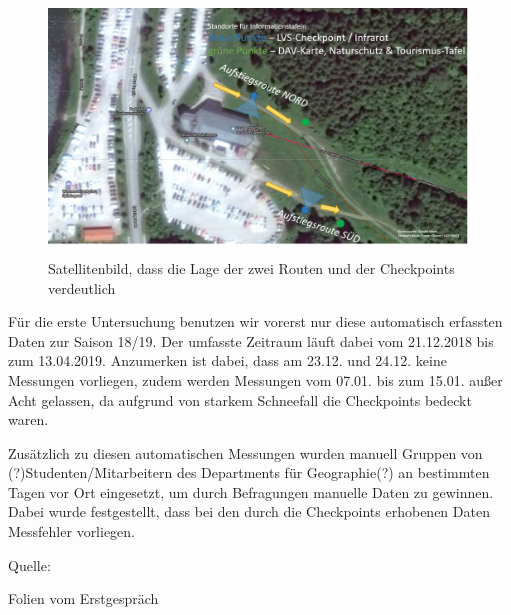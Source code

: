 \documentclass[12pt]{scrreprt}
\begin{document}
	
	
	\begin{figure}[H]
		
		\centering
		
		\includegraphics[width=.9\textwidth]{checkpoints}
		
		\caption{Satellitenbild, dass die Lage der zwei Routen und der Checkpoints verdeutlich}
		
		\label{pic:checkpoints}
		
	\end{figure}
	
	
	
	\noindent Für die erste Untersuchung benutzen wir vorerst nur diese automatisch erfassten Daten zur Saison 18/19. Der umfasste Zeitraum läuft dabei vom 21.12.2018 bis zum 13.04.2019. Anzumerken ist dabei, dass am 23.12. und 24.12. keine Messungen vorliegen, zudem werden Messungen vom 07.01. bis zum 15.01. außer Acht gelassen, da aufgrund von starkem Schneefall die Checkpoints bedeckt waren.
	
	
	
	Zusätzlich zu diesen automatischen Messungen wurden manuell Gruppen von (?)Studenten/Mitarbeitern des Departments für Geographie(?) an bestimmten Tagen vor Ort eingesetzt, um durch Befragungen manuelle Daten zu gewinnen. Dabei wurde festgestellt, dass bei den durch die Checkpoints erhobenen Daten Messfehler vorliegen.
	
	
	
	Quelle:
	
	Folien vom Erstgespräch
	
	
	
\end{document}
